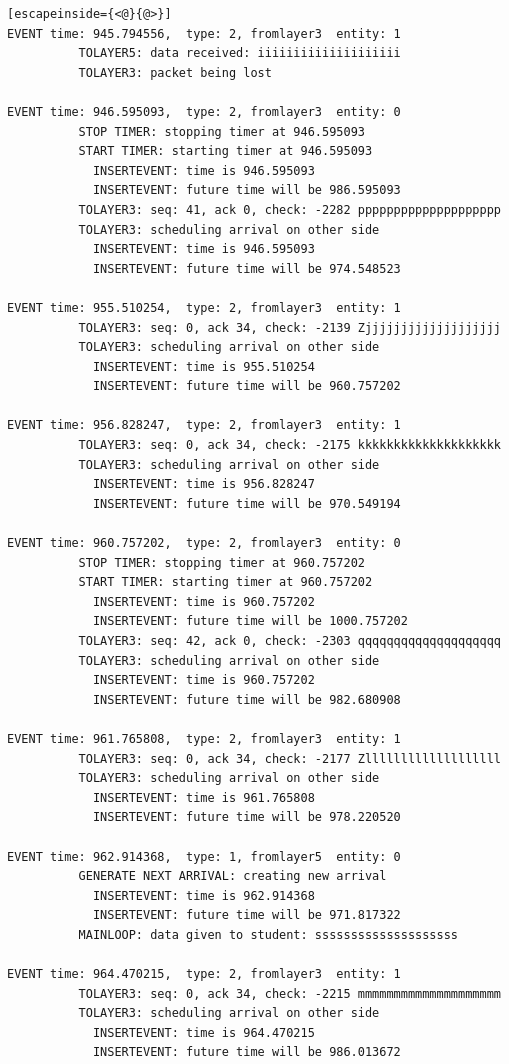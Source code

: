 \documentclass[paper=a4, fontsize=11pt]{scrartcl}
\numberwithin{equation}{section}		%
\numberwithin{figure}{section}			%
\numberwithin{table}{section}				%
\begin{document}
\begin{lstlisting}[escapeinside={<@}{@>}]
EVENT time: 945.794556,  type: 2, fromlayer3  entity: 1
          TOLAYER5: data received: iiiiiiiiiiiiiiiiiiii
          TOLAYER3: packet being lost

EVENT time: 946.595093,  type: 2, fromlayer3  entity: 0
          STOP TIMER: stopping timer at 946.595093
          START TIMER: starting timer at 946.595093
            INSERTEVENT: time is 946.595093
            INSERTEVENT: future time will be 986.595093
          TOLAYER3: seq: 41, ack 0, check: -2282 pppppppppppppppppppp
          TOLAYER3: scheduling arrival on other side
            INSERTEVENT: time is 946.595093
            INSERTEVENT: future time will be 974.548523

EVENT time: 955.510254,  type: 2, fromlayer3  entity: 1
          TOLAYER3: seq: 0, ack 34, check: -2139 Zjjjjjjjjjjjjjjjjjjj
          TOLAYER3: scheduling arrival on other side
            INSERTEVENT: time is 955.510254
            INSERTEVENT: future time will be 960.757202

EVENT time: 956.828247,  type: 2, fromlayer3  entity: 1
          TOLAYER3: seq: 0, ack 34, check: -2175 kkkkkkkkkkkkkkkkkkkk
          TOLAYER3: scheduling arrival on other side
            INSERTEVENT: time is 956.828247
            INSERTEVENT: future time will be 970.549194

EVENT time: 960.757202,  type: 2, fromlayer3  entity: 0
          STOP TIMER: stopping timer at 960.757202
          START TIMER: starting timer at 960.757202
            INSERTEVENT: time is 960.757202
            INSERTEVENT: future time will be 1000.757202
          TOLAYER3: seq: 42, ack 0, check: -2303 qqqqqqqqqqqqqqqqqqqq
          TOLAYER3: scheduling arrival on other side
            INSERTEVENT: time is 960.757202
            INSERTEVENT: future time will be 982.680908

EVENT time: 961.765808,  type: 2, fromlayer3  entity: 1
          TOLAYER3: seq: 0, ack 34, check: -2177 Zlllllllllllllllllll
          TOLAYER3: scheduling arrival on other side
            INSERTEVENT: time is 961.765808
            INSERTEVENT: future time will be 978.220520

EVENT time: 962.914368,  type: 1, fromlayer5  entity: 0
          GENERATE NEXT ARRIVAL: creating new arrival
            INSERTEVENT: time is 962.914368
            INSERTEVENT: future time will be 971.817322
          MAINLOOP: data given to student: ssssssssssssssssssss

EVENT time: 964.470215,  type: 2, fromlayer3  entity: 1
          TOLAYER3: seq: 0, ack 34, check: -2215 mmmmmmmmmmmmmmmmmmmm
          TOLAYER3: scheduling arrival on other side
            INSERTEVENT: time is 964.470215
            INSERTEVENT: future time will be 986.013672


\end{lstlisting}
\end{document}
